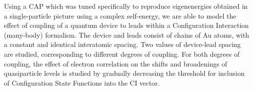 Using a \acl{CAP} which was tuned specifically to reproduce eigenenergies
obtained in a single-particle picture using a complex self-energy, we are able
to model the effect of coupling of a quantum device to leads within a
Configuration Interaction (many-body) formalism. The device and leads consist
of chains of Au atoms, with a constant and identical interatomic spacing. Two
values of device-lead spacing are studied, corresponding to different degrees
of coupling. For both degrees of coupling, the effect of electron correlation
on the shifts and broadenings of quasiparticle levels is studied by gradually
decreasing the threshold for inclusion of Configuration State Functions into
the CI vector.

